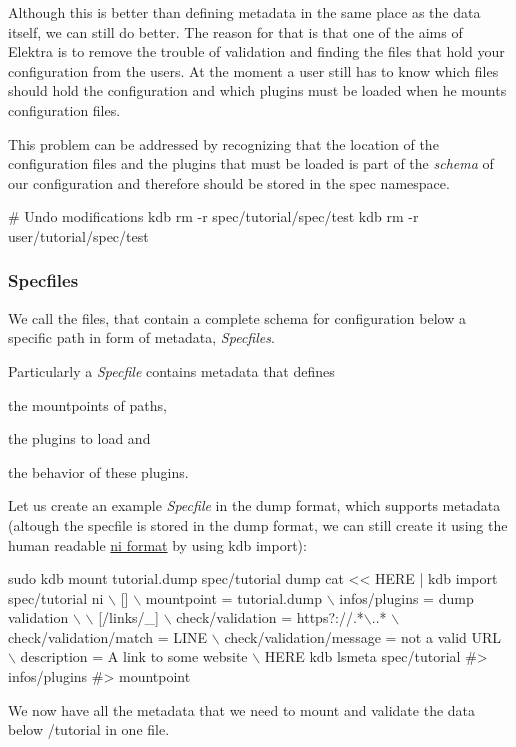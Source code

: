 Although this is better than defining metadata in the same place as the data itself, we can still do better. The reason for that is that one of the aims of Elektra is to remove the trouble of validation and finding the files that hold your configuration from the users. At the moment a user still has to know which files should hold the configuration and which plugins must be loaded when he mounts configuration files.

This problem can be addressed by recognizing that the location of the configuration files and the plugins that must be loaded is part of the {\itshape schema} of our configuration and therefore should be stored in the spec namespace.


\begin{DoxyCode}
# Undo modifications
kdb rm -r spec/tutorial/spec/test
kdb rm -r user/tutorial/spec/test
\end{DoxyCode}


\subsubsection*{Specfiles}

We call the files, that contain a complete schema for configuration below a specific path in form of metadata, {\itshape Specfiles}.

Particularly a {\itshape Specfile} contains metadata that defines
\begin{DoxyItemize}
\item the mountpoints of paths,
\item the plugins to load and
\item the behavior of these plugins.
\end{DoxyItemize}

Let us create an example {\itshape Specfile} in the dump format, which supports metadata (altough the specfile is stored in the dump format, we can still create it using the human readable \hyperlink{md_src_plugins_ni_README_src_plugins_ni_README_md}{ni format} by using {\ttfamily kdb import})\+: 
\begin{DoxyCode}
sudo kdb mount tutorial.dump spec/tutorial dump
cat << HERE | kdb import spec/tutorial ni  \(\backslash\)
[]                                         \(\backslash\)
 mountpoint = tutorial.dump                \(\backslash\)
 infos/plugins = dump validation           \(\backslash\)
                                           \(\backslash\)
[/links/\_]                                 \(\backslash\)
check/validation = https?://.*\(\backslash\)..*         \(\backslash\)
check/validation/match = LINE              \(\backslash\)
check/validation/message = not a valid URL \(\backslash\)
description = A link to some website       \(\backslash\)
HERE
kdb lsmeta spec/tutorial
#> infos/plugins
#> mountpoint
\end{DoxyCode}
 We now have all the metadata that we need to mount and validate the data below {\ttfamily /tutorial} in one file.

